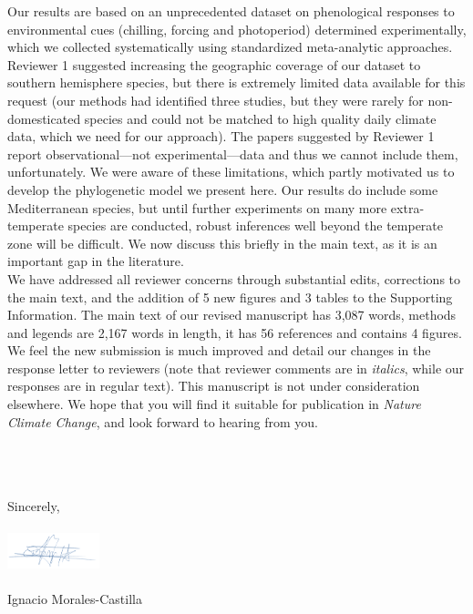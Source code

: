 \documentclass[11pt,a4paper]{letter}
\begin{document}
\begin{letter}{}
Our results are based on an unprecedented dataset on phenological responses to environmental cues (chilling, forcing and photoperiod) determined experimentally, which we collected systematically using standardized meta-analytic approaches. Reviewer 1 suggested increasing the geographic coverage of our dataset to southern hemisphere species, but there is extremely limited data available for this request (our methods had identified three studies, but they were rarely for non-domesticated species and could not be matched to high quality daily climate data, which we need for our approach). The papers suggested by Reviewer 1 report observational---not experimental---data and thus we cannot include them, unfortunately. We were aware of these limitations, which partly motivated us to develop the phylogenetic model we present here. Our results do include some Mediterranean species, but until further experiments on many more extra-temperate species are conducted, robust inferences well beyond the temperate zone will be difficult. We now discuss this briefly in the main text, as it is an important gap in the literature. %
\vspace{1.5ex}\\
We have addressed all reviewer concerns through substantial edits, corrections to the main text, and the addition of 5 new figures and 3 tables to the Supporting Information. The main text of our revised manuscript has 3,087 words, methods and legends are 2,167 words in length, it has 56 references and contains 4 figures. We feel the new submission is much improved and detail our changes in the response letter to reviewers (note that reviewer comments are in \emph{italics}, while our responses are in regular text).  This manuscript is not under consideration elsewhere.  We hope that you will find it suitable for publication in \emph{Nature Climate Change}, and look forward to hearing from you.


\vspace{0.25ex}\\
\vspace{1.5ex}\\


\vspace{1.5ex}\\
\noindent Sincerely,\\
\vspace{1.5ex}\\
 \includegraphics[width=0.2\textwidth]{Signature_IMC.png} \\
 \vspace{1.5ex}\\
\noindent Ignacio Morales-Castilla



\end{letter}
\end{document}

